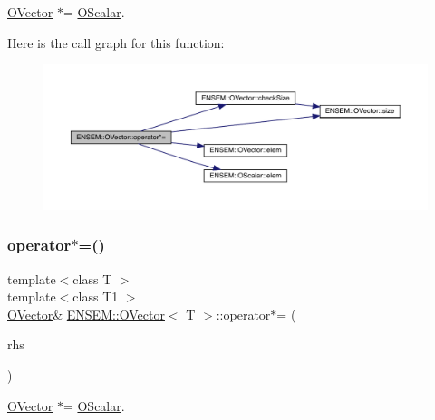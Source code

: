 \mbox{\hyperlink{classENSEM_1_1OVector}{O\+Vector}} $\ast$= \mbox{\hyperlink{classENSEM_1_1OScalar}{O\+Scalar}}. 

Here is the call graph for this function\+:
\nopagebreak
\begin{figure}[H]
\begin{center}
\leavevmode
\includegraphics[width=350pt]{d0/d8d/classENSEM_1_1OVector_a55710cffaf6c877d2465af80ad8b6c49_cgraph}
\end{center}
\end{figure}
\mbox{\label{classENSEM_1_1OVector_a55710cffaf6c877d2465af80ad8b6c49}} 
\subsubsection{\texorpdfstring{operator$\ast$=()}{operator*=()}\hspace{0.1cm}{\footnotesize\ttfamily [2/6]}}
{\footnotesize\ttfamily template$<$class T $>$ \\
template$<$class T1 $>$ \\
\mbox{\hyperlink{classENSEM_1_1OVector}{O\+Vector}}\& \mbox{\hyperlink{classENSEM_1_1OVector}{E\+N\+S\+E\+M\+::\+O\+Vector}}$<$ T $>$\+::operator$\ast$= (\begin{DoxyParamCaption}\item[{const \mbox{\hyperlink{classENSEM_1_1OScalar}{O\+Scalar}}$<$ T1 $>$ \&}]{rhs }\end{DoxyParamCaption})\hspace{0.3cm}{\ttfamily [inline]}}



\mbox{\hyperlink{classENSEM_1_1OVector}{O\+Vector}} $\ast$= \mbox{\hyperlink{classENSEM_1_1OScalar}{O\+Scalar}}. 

